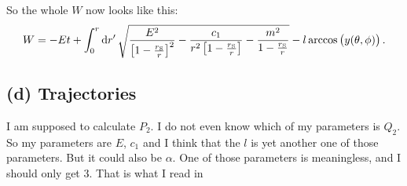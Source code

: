 So the whole $W$ now looks like this:
\[
    W = - Et + \int_0^r \dif{r'} \, \sqrt{ \frac{E^2}{\Group{1 - \frac{r_\text S}r}^2} -
        \frac{c_1}{r^2 \Group{1 - \frac{r_\text S}r}} - \frac{m^2}{1 - \frac{r_\text
    S}{r}}} - l \arccos\del{y(\theta, \phi)}.
\]

\subsection*{(d) Trajectories}

I am supposed to calculate $P_2$. I do not even know which of my parameters is
$Q_2$. So my parameters are $E$, $c_1$ and I think that the $l$ is yet another
one of those parameters. But it could also be $\alpha$. One of those parameters
is meaningless, and I should only get 3. That is what I read in
\parencite{Kuypers/Mechanik}

\IfFileExists{\bibliographyfile}{
    \printbibliography
}{}



